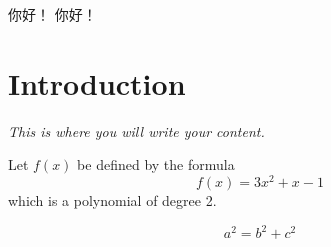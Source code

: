 \documentclass[10pt]{article} %
\begin{document}
	{ 你好！}
	{ 你好！}




	\section{Introduction} 

	{\ttfamily \itshape This is where you will write your content. }


	\rmfamily Let $f(x)$ be defined by the formula $$f(x)=3x^2+x-1$$ which is a polynomial of degree 2.

	\begin{equation}
	a^2 = b^2+c^2
	\end{equation}
\end{document}
